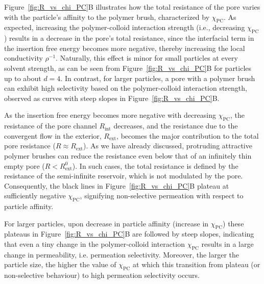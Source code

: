 \documentclass[12pt, a4paper]{article}
\begin{document}
Figure~\ref{fig:R_vs_chi_PC}B illustrates how the total resistance of the pore varies with the particle's affinity to the polymer brush, characterized by $\chi_{\text{PC}}$.
As expected, increasing the polymer-colloid interaction strength (i.e., decreasing $\chi_{\text{PC}}$) results in a decrease in the pore's total resistance, since the interfacial term in the insertion free energy becomes more negative, thereby increasing the local conductivity $\rho^{-1}$.
Naturally, this effect is minor for small particles at every solvent strength, as can be seen from Figure~\ref{fig:R_vs_chi_PC}B for particles up to about $d = 4$.
In contrast, for larger particles, a pore with a polymer brush can exhibit high selectivity based on the polymer-colloid interaction strength, observed as curves with steep slopes in Figure~\ref{fig:R_vs_chi_PC}B.

As the insertion free energy becomes more negative with decreasing $\chi_{\text{PC}}$, the resistance of the pore channel $R_{\text{int}}$ decreases, and the resistance due to the convergent flow in the exterior, $R_{\text{ext}}$, becomes the major contribution to the total pore resistance ($R \approx R_{\text{ext}}$).
As we have already discussed, protruding attractive polymer brushes can reduce the resistance even below that of an infinitely thin empty pore ($R < R_{\text{ext}}^{0}$).
In such cases, the total resistance is defined by the resistance of the semi-infinite reservoir, which is not modulated by the pore.
Consequently, the black lines in Figure~\ref{fig:R_vs_chi_PC}B plateau at sufficiently negative $\chi_{\text{PC}}$, signifying non-selective permeation with respect to particle affinity.

For larger particles, upon decrease in particle affinity (increase in $\chi_{\text{PC}}$) these plateaus in Figure~\ref{fig:R_vs_chi_PC}B are followed by steep slopes, indicating that even a tiny change in the polymer-colloid interaction $\chi_{\text{PC}}$ results in a large change in permeability, i.e. permeation selectivity.
Moreover, the larger the particle size, the higher the value of $\chi_{\text{PC}}$ at which this transition from plateau (or non-selective behaviour) to high permeation selectivity occurs.
\end{document}
